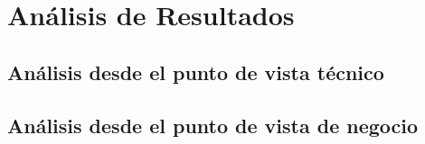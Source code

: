 \chapter{Análisis de Resultados}
\label{chapter:solution}

\Blindtext[1]

\section{Análisis desde el punto de vista técnico}
\label{section:analisis-tecnico}

\Blindtext[1]

\section{Análisis desde el punto de vista de negocio}
\label{section:analisis-negocio}

\Blindtext[1]

